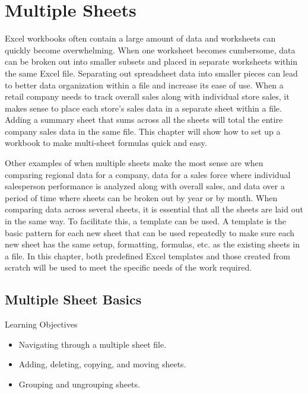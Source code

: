 \chapter{Multiple Sheets}\label{ch06:multiple_sheets}

Excel workbooks often contain a large amount of data and worksheets can quickly become overwhelming. When one worksheet becomes cumbersome, data can be broken out into smaller subsets and placed in separate worksheets within the same Excel file. Separating out spreadsheet data into smaller pieces can lead to better data organization within a file and increase its ease of use. When a retail company needs to track overall sales along with individual store sales, it makes sense to place each store's sales data in a separate sheet within a file. Adding a summary sheet that sums across all the sheets will total the entire company sales data in the same file. This chapter will show how to set up a workbook to make multi-sheet formulas quick and easy.

Other examples of when multiple sheets make the most sense are when comparing regional data for a company, data for a sales force where individual salesperson performance is analyzed along with overall sales, and data over a period of time where sheets can be broken out by year or by month. When comparing data across several sheets, it is essential that all the sheets are laid out in the same way. To facilitate this, a template can be used. A template is the basic pattern for each new sheet that can be used repeatedly to make sure each new sheet has the same setup, formatting, formulas, etc. as the existing sheets in a file. In this chapter, both predefined Excel templates and those created from scratch will be used to meet the specific needs of the work required.

\section{Multiple Sheet Basics}

\begin{center}
	\begin{objbox}{Learning Objectives}
		\begin{itemize}
			\setlength{\itemsep}{0pt}
			\setlength{\parskip}{0pt}
			\setlength{\parsep}{0pt}
			
			\item Navigating through a multiple sheet file.
			\item Adding, deleting, copying, and moving sheets.
			\item Grouping and ungrouping sheets.

		\end{itemize}
	\end{objbox}
\end{center}

